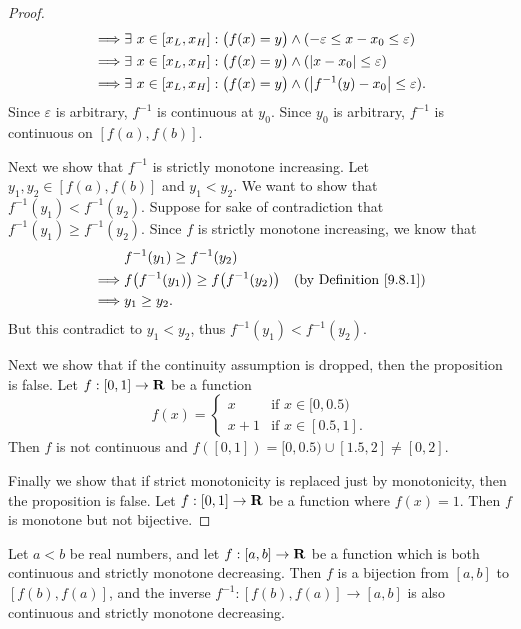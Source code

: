 \begin{proof}
\begin{align*}
        \implies & \exists\ x \in [x_L, x_H] : \big(f(x) = y\big) \land (-\varepsilon \leq x - x_0 \leq \varepsilon)                                   \\
        \implies & \exists\ x \in [x_L, x_H] : \big(f(x) = y\big) \land (\left\lvert x - x_0\right\rvert \leq \varepsilon)                                               \\
        \implies & \exists\ x \in [x_L, x_H] : \big(f(x) = y\big) \land (\left\lvert f^{-1}(y) - x_0\right\rvert \leq \varepsilon).
    \end{align*}
    Since \(\varepsilon\) is arbitrary, \(f^{-1}\) is continuous at \(y_0\).
    Since \(y_0\) is arbitrary, \(f^{-1}\) is continuous on \([f(a), f(b)]\).

    Next we show that \(f^{-1}\) is strictly monotone increasing.
    Let \(y_1, y_2 \in [f(a), f(b)]\) and \(y_1 < y_2\).
    We want to show that \(f^{-1}(y_1) < f^{-1}(y_2)\).
    Suppose for sake of contradiction that \(f^{-1}(y_1) \geq f^{-1}(y_2)\).
    Since \(f\) is strictly monotone increasing, we know that
    \begin{align*}
                 & f^{-1}(y_1) \geq f^{-1}(y_2)                                                            \\
        \implies & f\big(f^{-1}(y_1)\big) \geq f\big(f^{-1}(y_2)\big) & \text{(by Definition \ref{9.8.1})} \\
        \implies & y_1 \geq y_2.
    \end{align*}
    But this contradict to \(y_1 < y_2\), thus \(f^{-1}(y_1) < f^{-1}(y_2)\).

    Next we show that if the continuity assumption is dropped, then the proposition is false.
    Let \(f : [0, 1] \to \mathbf{R}\) be a function
    \[
        f(x) = \begin{cases}
            x     & \text{if } x \in [0, 0.5)  \\
            x + 1 & \text{if } x \in [0.5, 1].
        \end{cases}
    \]
    Then \(f\) is not continuous and \(f([0, 1]) = [0, 0.5) \cup [1.5, 2] \neq [0, 2]\).

    Finally we show that if strict monotonicity is replaced just by monotonicity, then the proposition is false.
    Let \(f : [0, 1] \to \mathbf{R}\) be a function where \(f(x) = 1\).
    Then \(f\) is monotone but not bijective.
\end{proof}

\begin{additional corollary}\label{ac 9.8.1}
Let \(a < b\) be real numbers, and let \(f : [a, b] \to \mathbf{R}\) be a function which is both continuous and strictly monotone decreasing.
Then \(f\) is a bijection from \([a, b]\) to \([f(b), f(a)]\), and the inverse \(f^{-1} : [f(b), f(a)] \to [a, b]\) is also continuous and strictly monotone decreasing.
\end{additional corollary}

